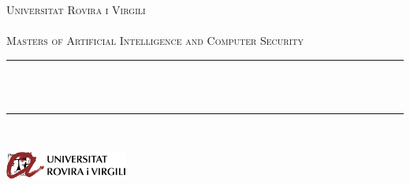 \begin{titlepage}
	\newcommand{\HRule}{\rule{\linewidth}{0.3mm}} %
	\center %
	
	\textsc{\LARGE Universitat Rovira i Virgili}\\[1.5cm]
	
	\textsc{\Large \deliverableName}\\[0.5cm]
	
	\textsc{\large Masters of Artificial Intelligence and Computer Security}\\[0.5cm]
	
	
	\HRule\\[0.4cm]
	
	{\huge\bfseries \@title}\\[0.4cm]
	
	\HRule\\[1.5cm]
	
	
	{\large\sc\@author} %
	
	
	\vfill\vfill
	{\large\@date} %
	\vfill\vfill\vfill
	
	
	
	\vfill
	\includegraphics[width=0.3\textwidth]{./urvlogo.png}
	\vfill
	
	
\end{titlepage}
